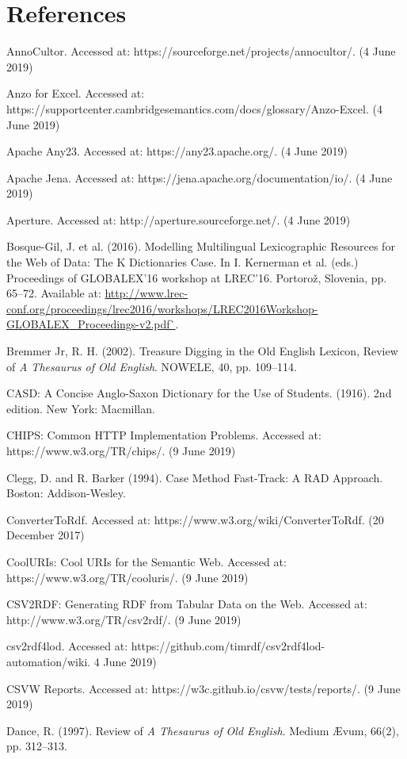 \section{References}
AnnoCultor. Accessed at: https://sourceforge.net/projects/annocultor/. (4 June 2019)

Anzo for Excel. Accessed at: https://supportcenter.cambridgesemantics.com/docs/glossary/Anzo-Excel. (4 June 2019)

Apache Any23. Accessed at: https://any23.apache.org/. (4 June 2019)

Apache Jena. Accessed at: https://jena.apache.org/documentation/io/. (4 June 2019)

Aperture. Accessed at: http://aperture.sourceforge.net/. (4 June 2019)

Bosque-Gil, J. et al. (2016). Modelling Multilingual Lexicographic Resources for the Web of Data: The K Dictionaries Case. In I. Kernerman et al. (eds.) Proceedings of GLOBALEX’16 workshop at LREC’16. Portorož, Slovenia, pp. 65–72. Available at: \url{http://www.lrec-conf.org/proceedings/lrec2016/workshops/LREC2016Workshop-GLOBALEX_Proceedings-v2.pdf`}.

Bremmer Jr, R. H. (2002). Treasure Digging in the Old English Lexicon, Review of \textit{A Thesaurus of Old English}. NOWELE, 40, pp. 109–114.

CASD: A Concise Anglo-Saxon Dictionary for the Use of Students. (1916). 2nd edition. New York: Macmillan.

CHIPS: Common HTTP Implementation Problems. Accessed at: https://www.w3.org/TR/chips/. (9 June 2019)

Clegg, D. and R. Barker (1994). Case Method Fast-Track: A RAD Approach. Boston: Addison-Wesley.

ConverterToRdf. Accessed at: https://www.w3.org/wiki/ConverterToRdf. (20 December 2017)

CoolURIs: Cool URIs for the Semantic Web. Accessed at: https://www.w3.org/TR/cooluris/. (9 June 2019)

CSV2RDF: Generating RDF from Tabular Data on the Web. Accessed at: http://www.w3.org/TR/csv2rdf/. (9 June 2019)

csv2rdf4lod. Accessed at: https://github.com/timrdf/csv2rdf4lod-automation/wiki. 4 June 2019)

CSVW Reports. Accessed at: https://w3c.github.io/csvw/tests/reports/. (9 June 2019)

Dance, R. (1997). Review of \textit{A Thesaurus of Old English}. Medium Ævum, 66(2), pp. 312–313.


